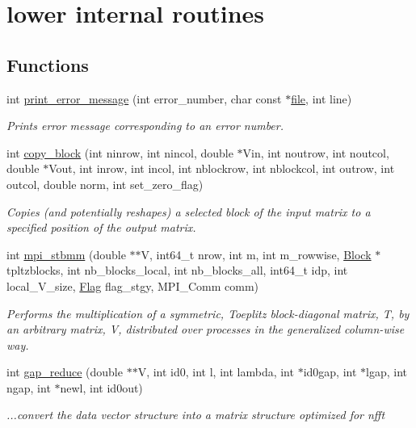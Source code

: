 \hypertarget{group__group22}{\section{lower internal routines}
\label{group__group22}
}
\subsection*{Functions}
\begin{DoxyCompactItemize}
\item 
int \hyperlink{group__group22_ga24331a8efb6e0b77df7c645ef45b2830}{print\-\_\-error\-\_\-message} (int error\-\_\-number, char const $\ast$\hyperlink{mkdoc_8dox_a049a073e5602cc325f7559a06c5a2420}{file}, int line)
\begin{DoxyCompactList}\small\item\em Prints error message corresponding to an error number. \end{DoxyCompactList}\item 
int \hyperlink{group__group22_ga7dddc7df6f787d6aa92dfc25e9d0465a}{copy\-\_\-block} (int ninrow, int nincol, double $\ast$Vin, int noutrow, int noutcol, double $\ast$Vout, int inrow, int incol, int nblockrow, int nblockcol, int outrow, int outcol, double norm, int set\-\_\-zero\-\_\-flag)
\begin{DoxyCompactList}\small\item\em Copies (and potentially reshapes) a selected block of the input matrix to a specified position of the output matrix. \end{DoxyCompactList}\item 
int \hyperlink{group__group22_gaa7ea4ac654fcb9f5fe3bad139febb65d}{mpi\-\_\-stbmm} (double $\ast$$\ast$V, int64\-\_\-t nrow, int m, int m\-\_\-rowwise, \hyperlink{structBlock}{Block} $\ast$tpltzblocks, int nb\-\_\-blocks\-\_\-local, int nb\-\_\-blocks\-\_\-all, int64\-\_\-t idp, int local\-\_\-\-V\-\_\-size, \hyperlink{structFlag}{Flag} flag\-\_\-stgy, M\-P\-I\-\_\-\-Comm comm)
\begin{DoxyCompactList}\small\item\em Performs the multiplication of a symmetric, Toeplitz block-\/diagonal matrix, T, by an arbitrary matrix, V, distributed over processes in the generalized column-\/wise way. \end{DoxyCompactList}\item 
int \hyperlink{group__group22_ga8c05d2ff1d358740d1c8965040e7080a}{gap\-\_\-reduce} (double $\ast$$\ast$V, int id0, int l, int lambda, int $\ast$id0gap, int $\ast$lgap, int ngap, int $\ast$newl, int id0out)
\begin{DoxyCompactList}\small\item\em ...convert the data vector structure into a matrix structure optimized for nfft \end{DoxyCompactList}\end{DoxyCompactItemize}


